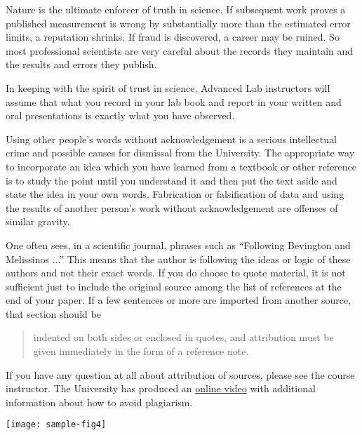 Nature is the ultimate enforcer of truth in science. If subsequent
work proves a published measurement is wrong by substantially more
than the estimated error limits, a reputation shrinks. If fraud is
discovered, a career may be ruined. So most professional scientists
are very careful about the records they maintain and the results and
errors they publish.

In keeping with the spirit of trust in science, Advanced Lab instructors
will assume that what you record in your lab book and report in your
written and oral presentations is exactly what you have observed.

Using other people's words without acknowledgement is a
serious intellectual crime and possible causes for dismissal from the University.
The appropriate way to incorporate an
idea which you have learned from a textbook or other reference is to
study the point until you understand it and then put the text aside
and state the idea in your own words.
Fabrication or falsification of data and using the results of
another person's work without acknowledgement are offenses of similar gravity.

One often sees, in a scientific journal, phrases such as ``Following
Bevington and Melissinos \cite{bevington2003, melissinos1966} ...''
This means that the author is following the ideas or logic of these
authors and not their exact words.
If you do choose to quote material, it is not sufficient just to
include the original source among the list of references at the end of
your paper. If a few sentences or more are imported from another
source, that section should be

\begin{quote}indented on both sides or enclosed in
quotes, and attribution must be given immediately in the form of a
reference note.\cite{melissinos1966}
\end{quote}

If you have any question at all about attribution of sources, please
see the course instructor.
The University has produced an
\href{http://uwf.edu/library/research_help/using-sources-ethically/}{online video}
with additional information about how to avoid plagiarism.

\begin{figure*}[htb] %
\label{fig:crop}
\texttt{[image: sample-fig4]}
\caption{
This is a two-column figure using the \texttt{figure*} environment. 
Two column figures can't be on the first page and \LaTeX\ often
has trouble with their placement.
}
\begin{comment}
\end{comment}
\end{figure*}

